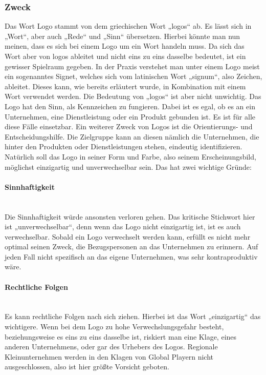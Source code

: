 \subsubsection{Zweck}
Das Wort Logo stammt von dem griechischen Wort „logos“ ab. Es lässt sich in „Wort“, aber auch „Rede“ und „Sinn“ übersetzen. Hierbei könnte man nun meinen, dass es sich bei einem Logo um ein Wort handeln muss. Da sich das Wort aber von logos ableitet und nicht eins zu eins dasselbe bedeutet, ist ein gewisser Spielraum gegeben. In der Praxis verstehet man unter einem Logo meist ein sogenanntes Signet, welches sich vom latinischen Wort „signum“, also Zeichen, ableitet. Dieses kann, wie bereits erläutert wurde, in Kombination mit einem Wort verwendet werden. Die Bedeutung von „logos“ ist aber nicht unwichtig. Das Logo hat den Sinn, als Kennzeichen zu fungieren. Dabei ist es egal, ob es an ein Unternehmen, eine Dienstleistung oder ein Produkt gebunden ist. Es ist für alle diese Fälle einsetzbar. Ein weiterer Zweck von Logos ist die Orientierungs- und Entscheidungshilfe. Die Zielgruppe kann an diesen nämlich die Unternehmen, die hinter den Produkten oder Dienstleistungen stehen, eindeutig identifizieren.\cite{logozweck}\cite{logobedeutung}
\\ 
Natürlich soll das Logo in seiner Form und Farbe, also seinem Erscheinungsbild, möglichst einzigartig und unverwechselbar sein. Das hat zwei wichtige Gründe:

\paragraph{Sinnhaftigkeit}
\leavevmode \\
Die Sinnhaftigkeit würde ansonsten verloren gehen. Das kritische Stichwort hier ist „unverwechselbar“, denn wenn das Logo nicht einzigartig ist, ist es auch verwechselbar. Sobald ein Logo verwechselt werden kann, erfüllt es nicht mehr optimal seinen Zweck, die Bezugspersonen an das Unternehmen zu erinnern. Auf jeden Fall nicht spezifisch an das eigene Unternehmen, was sehr kontraproduktiv wäre.

\paragraph{Rechtliche Folgen}
\leavevmode \\
Es kann rechtliche Folgen nach sich ziehen. Hierbei ist das Wort „einzigartig“ das wichtigere. Wenn bei dem Logo zu hohe Verwechslungsgefahr besteht, beziehungsweise es eins zu eins dasselbe ist, riskiert man eine Klage, eines anderen Unternehmens, oder gar des Urhebers des Logos. Regionale Kleinunternehmen werden in den Klagen von Global Playern nicht ausgeschlossen, also ist hier größte Vorsicht geboten.\cite{logorecht}\cite{logofolgen}

